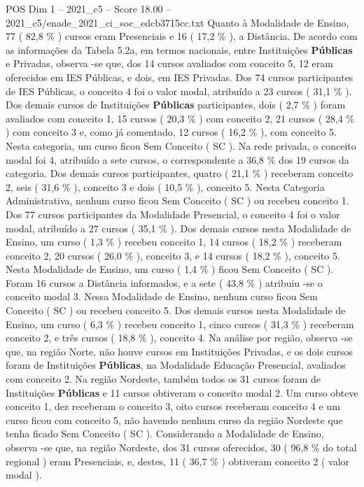 \begin{textsample}{POS Dim 1 – 2021\_c5 – Score 18.00 – 2021\_c5/enade\_2021\_ci\_soc\_edcb3715cc.txt}
Quanto à Modalidade de Ensino, 77 ( 82,8 \% ) cursos eram Presenciais e 16 ( 17,2 \% ), a Distância.
De acordo com as informações da Tabela 5.2a, em termos nacionais, entre Instituições \textbf{Públicas} e Privadas, observa -se que, dos 14 cursos avaliados com conceito 5, 12 eram oferecidos em IES Públicas, e dois, em IES Privadas.
Dos 74 cursos participantes de IES Públicas, o conceito 4 foi o valor modal, atribuído a 23 cursos ( 31,1 \% ).
Dos demais cursos de Instituições \textbf{Públicas} participantes, dois ( 2,7 \% ) foram avaliados com conceito 1, 15 cursos ( 20,3 \% ) com conceito 2, 21 cursos ( 28,4 \% ) com conceito 3 e, como já comentado, 12 cursos ( 16,2 \% ), com conceito 5.
Nesta categoria, um curso ficou Sem Conceito ( SC ).
Na rede privada, o conceito modal foi 4, atribuído a sete cursos, o correspondente a 36,8 \% dos 19 cursos da categoria.
Dos demais cursos participantes, quatro ( 21,1 \% ) receberam conceito 2, seis ( 31,6 \% ), conceito 3 e dois ( 10,5 \% ), conceito 5.
Nesta Categoria Administrativa, nenhum curso ficou Sem Conceito ( SC ) ou recebeu conceito 1.
Dos 77 cursos participantes da Modalidade Presencial, o conceito 4 foi o valor modal, atribuído a 27 cursos ( 35,1 \% ).
Dos demais cursos nesta Modalidade de Ensino, um curso ( 1,3 \% ) recebeu conceito 1, 14 cursos ( 18,2 \% ) receberam conceito 2, 20 cursos ( 26,0 \% ), conceito 3, e 14 cursos ( 18,2 \% ), conceito 5.
Nesta Modalidade de Ensino, um curso ( 1,4 \% ) ficou Sem Conceito ( SC ).
Foram 16 cursos a Distância informados, e a sete ( 43,8 \% ) atribuiu -se o conceito modal 3.
Nessa Modalidade de Ensino, nenhum curso ficou Sem Conceito ( SC ) ou recebeu conceito 5.
Dos demais cursos nesta Modalidade de Ensino, um curso ( 6,3 \% ) recebeu conceito 1, cinco cursos ( 31,3 \% ) receberam conceito 2, e três cursos ( 18,8 \% ), conceito 4.
Na análise por região, observa -se que, na região Norte, não houve cursos em Instituições Privadas, e os dois cursos foram de Instituições \textbf{Públicas}, na Modalidade Educação Presencial, avaliados com conceito 2.
Na região Nordeste, também todos os 31 cursos foram de Instituições \textbf{Públicas} e 11 cursos obtiveram o conceito modal 2.
Um curso obteve conceito 1, dez receberam o conceito 3, oito cursos receberam conceito 4 e um curso ficou com conceito 5, não havendo nenhum curso da região Nordeste que tenha ficado Sem Conceito ( SC ).
Considerando a Modalidade de Ensino, observa -se que, na região Nordeste, dos 31 cursos oferecidos, 30 ( 96,8 \% do total regional ) eram Presenciais, e, destes, 11 ( 36,7 \% ) obtiveram conceito 2 ( valor modal ).

\end{textsample}
